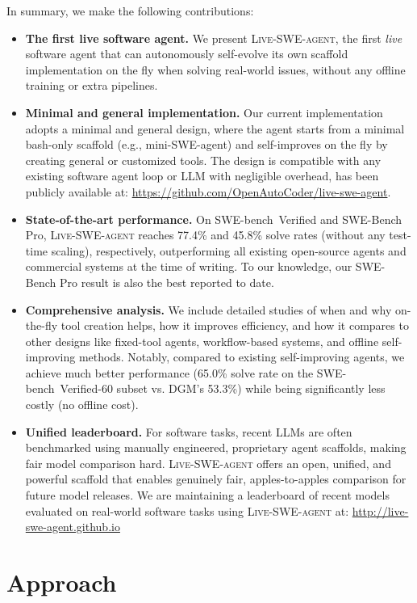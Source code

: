 \documentclass{article}
\newcommand{\minisweagent}{mini-SWE-agent\xspace}
\newcommand{\livesweagent}{\textsc{Live-SWE-agent}\xspace}
\newcommand{\dgm}{DGM\xspace}
\newcommand{\sbv}{SWE-bench~Verified\xspace}
\newcommand{\swebenchpro}{SWE-Bench Pro\xspace}
\begin{document}
In summary, we make the following contributions:

\begin{itemize}[leftmargin=*]
\item \textbf{The first live software agent.}  We present \livesweagent, the first \emph{live} software agent that can autonomously self-evolve its own scaffold implementation on the fly when solving real-world issues,
without any offline training or extra pipelines.
\item \textbf{Minimal and general implementation.} Our current implementation adopts a minimal and general design, where the agent starts from a minimal bash-only scaffold (e.g., \minisweagent) and self-improves on the fly by creating general or customized tools. The design is compatible with any existing software agent loop or LLM with negligible overhead, has been publicly available at: {\color{purple}\url{https://github.com/OpenAutoCoder/live-swe-agent}}.
\item \textbf{State-of-the-art performance.}
On \sbv and \swebenchpro, \livesweagent reaches 77.4\% and 45.8\% solve rates (without any test-time scaling), respectively, outperforming all existing open-source agents and commercial systems at the time of writing. To our knowledge, our \swebenchpro result is also the best reported to date.
\item \textbf{Comprehensive analysis.} We include detailed studies of when and why on-the-fly tool creation helps, how it improves efficiency, and how it compares to other designs like fixed-tool agents, workflow-based systems, and offline self-improving methods. Notably, compared to existing self-improving agents, we achieve much better performance (65.0\% solve rate on the \sbv-60 subset vs. \dgm's 53.3\%)
while being significantly less costly (no offline cost).

\item \textbf{Unified leaderboard.} For software tasks, recent LLMs are often benchmarked using manually engineered, proprietary agent scaffolds, making fair model comparison hard. 
 \livesweagent offers an open, unified, and powerful scaffold that enables genuinely fair, apples-to-apples comparison for future model releases. We are maintaining a leaderboard of recent models evaluated on real-world software tasks using \livesweagent at: {\color{purple}\url{http://live-swe-agent.github.io}}
\end{itemize}



\section{Approach}
\end{document}
